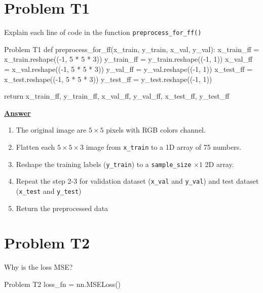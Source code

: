 \documentclass[12pt, a4paper]{article}
\begin{document}
    \pagebreak

        \section{Problem T1}
            Explain each line of code in the function \texttt{preprocess\_for\_ff()}
            \begin{codeblock}{Problem T1}
                def preprocess_for_ff(x_train, y_train, x_val, y_val):
                    x_train_ff = x_train.reshape((-1, 5 * 5 * 3))
                    y_train_ff = y_train.reshape((-1, 1))
                    x_val_ff = x_val.reshape((-1, 5 * 5 * 3))
                    y_val_ff = y_val.reshape((-1, 1))
                    x_test_ff = x_test.reshape((-1, 5 * 5 * 3))
                    y_test_ff = y_test.reshape((-1, 1))

                    return x_train_ff, y_train_ff, x_val_ff, y_val_ff, x_test_ff, y_test_ff
            \end{codeblock}

            \vspace{1em}

            \noindent \underline{\textbf{Answer}}

            \begin{enumerate}
                \item The original image are $5 \times 5$ pixels with RGB colors channel.
                \item Flatten each $5 \times 5 \times 3$ image from \texttt{x\_train} to a 1D array of 75 numbers.
                \item Reshape the training labels (\texttt{y\_train}) to a \texttt{sample\_size} $\times 1$ 2D array.
                \item Repeat the step 2-3 for validation dataset (\texttt{x\_val} and \texttt{y\_val})
                and test dataset (\texttt{x\_test} and \texttt{y\_test})
                \item Return the preprocessed data
            \end{enumerate}

        \section{Problem T2}
            Why is the loss MSE?

            \begin{codeblock}{Problem T2}
                loss_fn = nn.MSELoss()
            \end{codeblock}
\end{document}
